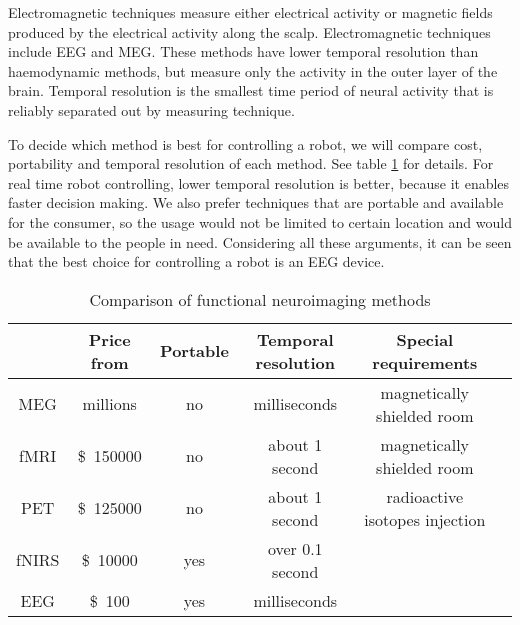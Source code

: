 Electromagnetic techniques measure either electrical activity or magnetic fields produced by the electrical activity along the scalp. Electromagnetic techniques include \acrfull{EEG} and \acrfull{MEG}. These methods have lower temporal resolution than haemodynamic methods, but measure only the activity in the outer layer of the brain. Temporal resolution is the smallest time period of neural activity that is reliably separated out by measuring technique.

To decide which method is best for controlling a robot, we will compare cost, portability and temporal resolution of each method. See table \ref{tab:neuroimaging} for details. For real time robot controlling, lower temporal resolution is better, because it enables faster decision making. We also prefer techniques that are portable and available for the consumer, so the usage would not be limited to certain location and would be available to the people in need. Considering all these arguments, it can be seen that the best choice for controlling a robot is an \acrshort{EEG} device.


\newcommand{\pMEG}{\tablefootnote{http://neurogadget.com/2012/12/15/inexpensive-magnetoencephalography-meg-system-could-be-available-at-every-hospital/6495}}
\newcommand{\pfMRI}{\tablefootnote{http://info.blockimaging.com/bid/92623/MRI-Machine-Cost-and-Price-Guide}}
\newcommand{\pPET}{\tablefootnote{http://info.blockimaging.com/bid/68875/How-Much-Does-a-PET-CT-Scanner-Cost}}
\newcommand{\plEEG}{\tablefootnote{http://en.wikipedia.org/wiki/Comparison\_of\_consumer\_brain-computer\_interfaces}}
\newcommand{\phEEG}{\tablefootnote{http://www.brainvision.com/files/actiCHamp-PyCorder-Flyer\_US.pdf}}
\newcommand{\pNIRS}{\cite{NIRS}}
\newcommand{\tresol}{\cite{timeresol}}


\begin{table}[h]
	\centering
	\begin{tabular}{|c|c|c|c|c|c|}
	\hline
				& Price	from				& Portable	& Temporal resolution	& Special requirements		\\\hline
\acrshort{MEG}	& millions\pMEG				& no	& milliseconds \tresol		& magnetically shielded room\\\hline
\acrshort{fMRI}	& \SI{150000}[\$]\pfMRI		& no	& about 1 second \tresol	& magnetically shielded room\\\hline
\acrshort{PET}	& \SI{125000}[\$]\pPET		& no	& about 1 second \tresol	& radioactive isotopes injection\\\hline
\acrshort{fNIRS}& \SI{10000}[\$]{} \pNIRS	& yes	& over 0.1 second \pNIRS	&							\\\hline
\acrshort{EEG}	& \SI{100}[\$]\plEEG		& yes	& milliseconds \tresol		&							\\\hline
	\end{tabular}
	\caption{Comparison of functional neuroimaging methods}
	\label{tab:neuroimaging}
\end{table}

